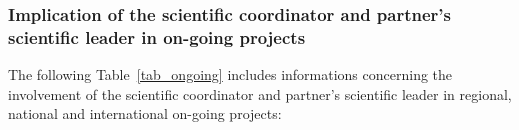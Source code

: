 \documentclass[a4paper,11pt]{article}
\begin{document}
    
    





\subsubsection{Implication of the scientific coordinator and partner's scientific leader in on-going projects}


The following Table~\ref{tab_ongoing} includes informations concerning the involvement of the scientific coordinator and partner's scientific leader in regional, national and international on-going projects:
\end{document}
